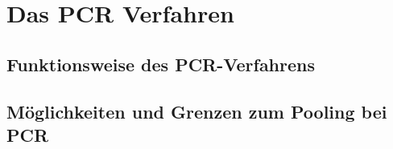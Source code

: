 \chapter{Das PCR Verfahren}

\section{Funktionsweise des PCR-Verfahrens}


\section{Möglichkeiten und Grenzen zum Pooling bei PCR}